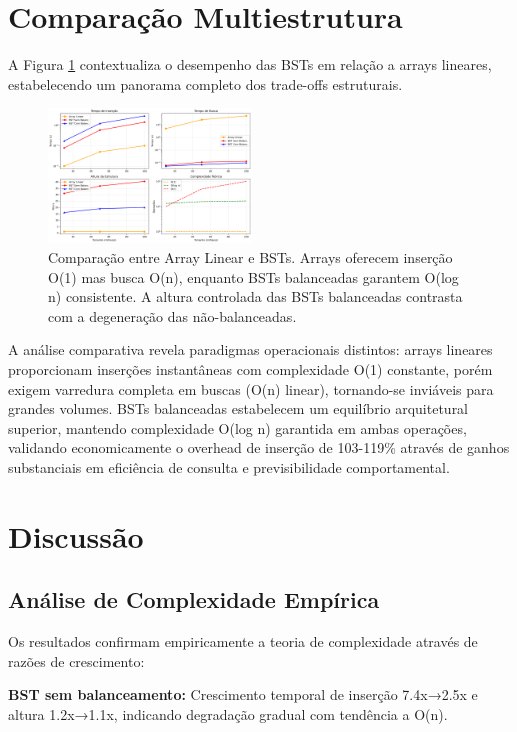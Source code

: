 \documentclass[conference]{IEEEtran}
\begin{document}
\section{Comparação Multiestrutura}
A Figura \ref{fig:comparacao_estruturas} contextualiza o desempenho das BSTs em relação a arrays lineares, estabelecendo um panorama completo dos trade-offs estruturais.

\begin{figure}[htbp]
\centerline{\includegraphics[width=0.48\textwidth]{comparacao_estruturas.png}}
\caption{Comparação entre Array Linear e BSTs. Arrays oferecem inserção O(1) mas busca O(n), enquanto BSTs balanceadas garantem O(log n) consistente. A altura controlada das BSTs balanceadas contrasta com a degeneração das não-balanceadas.}
\label{fig:comparacao_estruturas}
\end{figure}

A análise comparativa revela paradigmas operacionais distintos: arrays lineares proporcionam inserções instantâneas com complexidade O(1) constante, porém exigem varredura completa em buscas (O(n) linear), tornando-se inviáveis para grandes volumes. BSTs balanceadas estabelecem um equilíbrio arquitetural superior, mantendo complexidade O(log n) garantida em ambas operações, validando economicamente o overhead de inserção de 103-119\% através de ganhos substanciais em eficiência de consulta e previsibilidade comportamental.

\section{Discussão}

\subsection{Análise de Complexidade Empírica}
Os resultados confirmam empiricamente a teoria de complexidade através de razões de crescimento:

\textbf{BST sem balanceamento:} Crescimento temporal de inserção 7.4x→2.5x e altura 1.2x→1.1x, indicando degradação gradual com tendência a O(n).
\end{document}
